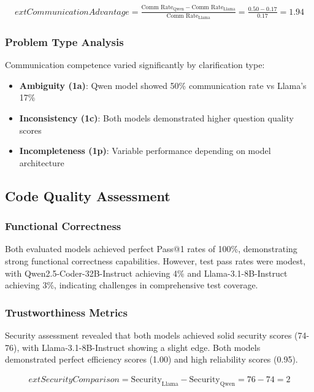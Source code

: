 \documentclass[conference]{IEEEtran}
\begin{document}
\begin{align}
        ext{Communication Advantage} = \frac{\text{Comm Rate}_{\text{Qwen}} - \text{Comm Rate}_{\text{Llama}}}{\text{Comm Rate}_{\text{Llama}}} = \frac{0.50 - 0.17}{0.17} = 1.94
\end{align}

\subsubsection{Problem Type Analysis}

Communication competence varied significantly by clarification type:

\begin{itemize}
    \item \textbf{Ambiguity (1a)}: Qwen model showed 50\% communication rate vs Llama's 17\%
    \item \textbf{Inconsistency (1c)}: Both models demonstrated higher question quality scores
    \item \textbf{Incompleteness (1p)}: Variable performance depending on model architecture
\end{itemize}

\subsection{Code Quality Assessment}

\subsubsection{Functional Correctness}

Both evaluated models achieved perfect Pass@1 rates of 100\%, demonstrating strong functional correctness capabilities. However, test pass rates were modest, with Qwen2.5-Coder-32B-Instruct achieving 4\% and Llama-3.1-8B-Instruct achieving 3\%, indicating challenges in comprehensive test coverage.

\subsubsection{Trustworthiness Metrics}

Security assessment revealed that both models achieved solid security scores (74-76), with Llama-3.1-8B-Instruct showing a slight edge. Both models demonstrated perfect efficiency scores (1.00) and high reliability scores (0.95).

\begin{align}
	ext{Security Comparison} = \text{Security}_{\text{Llama}} - \text{Security}_{\text{Qwen}} = 76 - 74 = 2
\end{align}
\end{document}
